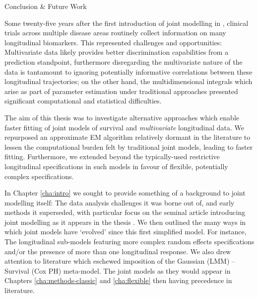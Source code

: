 \begin{chapter}{\label{cha:conclusion}Conclusion \& Future Work}

Some twenty-five years after the first introduction of joint modelling in \citet{Wulfsohn97}, clinical trials across multiple disease areas routinely collect information on many longitudinal biomarkers. This represented challenges and opportunities: Multivariate data likely provides better discrimination capabilities from a prediction standpoint, furthermore disregarding the multivariate nature of the data is tantamount to ignoring potentially informative correlations between these longitudinal trajectories; on the other hand, the multidimensional integrals which arise as part of parameter estimation under traditional approaches presented significant computational and statistical difficulties.

The aim of this thesis was to investigate alternative approaches which enable faster fitting of joint models of survival and \textit{multivariate} longitudinal data. We repurposed an approximate EM algorithm relatively dormant in the literature \citep{Bernhardt15} to lessen the computational burden felt by traditional joint models, leading to faster fitting. Furthermore, we extended beyond the typically-used restrictive longitudinal specifications in such models in favour of flexible, potentially complex specifications.

In Chapter \ref{cha:intro} we sought to provide something of a background to joint modelling itself: The data analysis challenges it was borne out of, and early methods it superseded, with particular focus on the seminal article introducing joint modelling as it appears in the thesis \citep{Wulfsohn97}. We then outlined the many ways in which joint models have `evolved' since this first simplified model. For instance, The longitudinal sub-models featuring more complex random effects specifications and/or the presence of more than one longitudinal response. We also drew attention to literature which eschewed imposition of the Gaussian (\ie LMM) -- Survival (\ie Cox PH) meta-model. The joint models as they would appear in Chapters \ref{cha:methods-classic} and \ref{cha:flexible} then having precedence in literature. 


\end{chapter}
